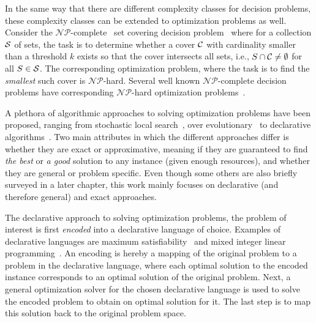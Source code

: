 In the same way that there are different complexity classes for decision problems, these complexity classes can be extended to optimization problems as well.
Consider the $\mathcal{NP}$-complete~\autocite{} set covering decision problem~\autocite{DBLP:conf/coco/Karp72} where for a collection $\mathcal{S}$ of sets, the task is to determine whether a cover $\mathcal{C}$ with cardinality smaller than a threshold $k$ exists so that the cover intersects all sets, i.e., $S \cap \mathcal{C} \neq \emptyset$ for all $S\in\mathcal{S}$.
The corresponding optimization problem, where the task is to find the \emph{smallest} such cover is $\mathcal{NP}$-hard.
Several well known $\mathcal{NP}$-complete decision problems have corresponding $\mathcal{NP}$-hard optimization problems~\autocite{KorteVygen2018-15}.

A plethora of algorithmic approaches to solving optimization problems have been proposed, ranging from stochastic local search~\autocite{}, over evolutionary~\autocite{Dasgupta2013,DBLP:journals/jgo/StornP97} to declarative algorithms~\autocite{}.
Two main attributes in which the different approaches differ is whether they are exact or approximative, meaning if they are guaranteed to find \emph{the best} or \emph{a good} solution to any instance (given enough resources), and whether they are general or problem specific.
Even though some others are also briefly surveyed in a later chapter, this work mainly focuses on declarative (and therefore general) and exact approaches.

The declarative approach to solving optimization problems, the problem of interest is first \emph{encoded} into a declarative language of choice.
Examples of declarative languages are maximum satisfiability~\autocite{handbook2-maxsat} and mixed integer linear programming~\autocite{ChenEtAl2010AppliedIntegerProgramming,KorteVygen2018-5}.
An encoding is hereby a mapping of the original problem to a problem in the declarative language, where each optimal solution to the encoded instance corresponds to an optimal solution of the original problem.
Next, a general optimization solver  for the chosen declarative language is used to solve the encoded problem to obtain on optimal solution for it.
The last step is to map this solution back to the original problem space.


